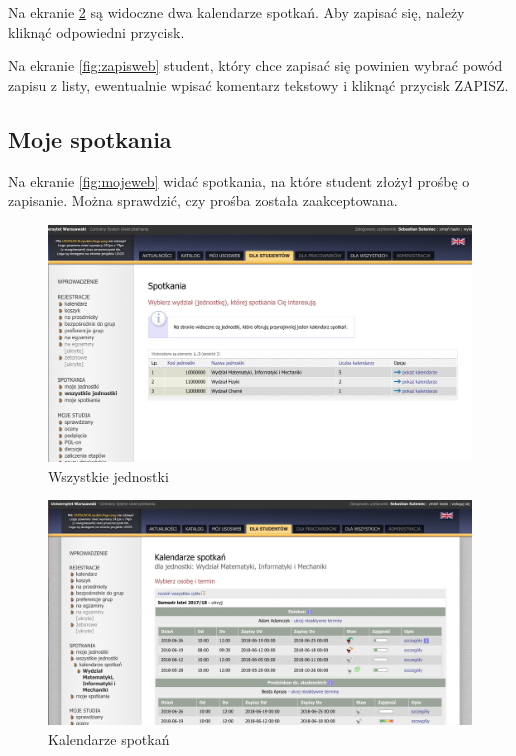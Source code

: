 \documentclass[licencjacka]{pracamgr}
\begin{document}
Na ekranie \ref{fig:kalweb} są widoczne dwa kalendarze spotkań. Aby zapisać się, należy kliknąć odpowiedni przycisk.

Na ekranie \ref{fig:zapisweb} student, który chce zapisać się powinien wybrać powód zapisu z listy, ewentualnie wpisać komentarz tekstowy i kliknąć przycisk \textsf{ZAPISZ}.

\subsection{Moje spotkania}

Na ekranie \ref{fig:mojeweb} widać spotkania, na które student złożył prośbę o zapisanie. Można sprawdzić, czy prośba została zaakceptowana.


\begin{figure}[!]
  \includegraphics[width=\linewidth]{wszystkie_jednostki_usosweb.jpg}
  \caption{Wszystkie jednostki}
  \label{fig:wszjweb}
\end{figure}

\begin{figure}[!]
  \includegraphics[width=\linewidth]{kalendarzUSOSweb.jpg}
  \caption{Kalendarze spotkań}
  \label{fig:kalweb}
\end{figure}
\end{document}
